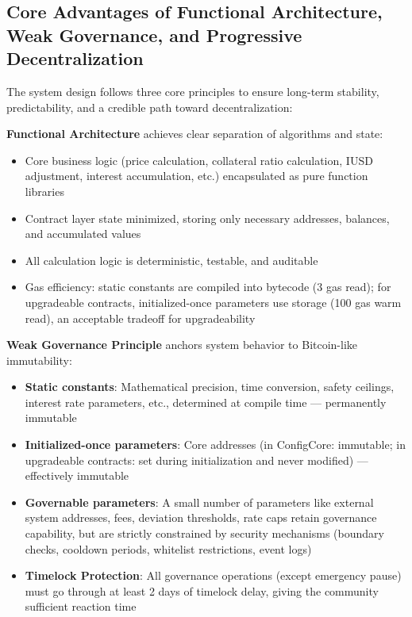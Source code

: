 \documentclass{article}
\begin{document}
\subsection{Core Advantages of Functional Architecture, Weak Governance, and Progressive Decentralization}

The system design follows three core principles to ensure long-term stability, predictability, and a credible path toward decentralization:

\textbf{Functional Architecture} achieves clear separation of algorithms and state:
\begin{itemize}
  \item Core business logic (price calculation, collateral ratio calculation, IUSD adjustment, interest accumulation, etc.) encapsulated as pure function libraries
  \item Contract layer state minimized, storing only necessary addresses, balances, and accumulated values
  \item All calculation logic is deterministic, testable, and auditable
  \item Gas efficiency: static constants are compiled into bytecode (3 gas read); for upgradeable contracts, initialized-once parameters use storage (100 gas warm read), an acceptable tradeoff for upgradeability
\end{itemize}

\textbf{Weak Governance Principle} anchors system behavior to Bitcoin-like immutability:
\begin{itemize}
  \item \textbf{Static constants}: Mathematical precision, time conversion, safety ceilings, interest rate parameters, etc., determined at compile time --- permanently immutable
  \item \textbf{Initialized-once parameters}: Core addresses (in ConfigCore: immutable; in upgradeable contracts: set during initialization and never modified) --- effectively immutable
  \item \textbf{Governable parameters}: A small number of parameters like external system addresses, fees, deviation thresholds, rate caps retain governance capability, but are strictly constrained by security mechanisms (boundary checks, cooldown periods, whitelist restrictions, event logs)
  \item \textbf{Timelock Protection}: All governance operations (except emergency pause) must go through at least 2 days of timelock delay, giving the community sufficient reaction time
\end{itemize}
\end{document}
